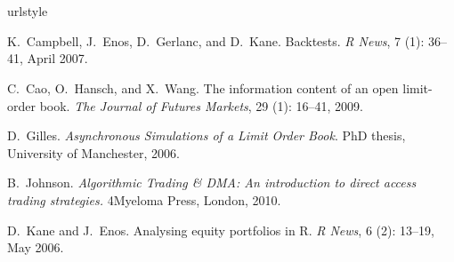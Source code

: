 \address{Andrew Liu\\
  Williams College\\
  Williamstown, MA\\
  USA}\\

\address{Khanh Nguyen\\
  University Of Massachusetts at Boston\\
  Boston, MA\\
  USA}\\

\begin{thebibliography}{5}
\providecommand{\natexlab}[1]{#1}
\providecommand{\url}[1]{\texttt{#1}}
\expandafter\ifx\csname urlstyle\endcsname\relax
  \providecommand{\doi}[1]{doi: #1}\else
  \providecommand{\doi}{doi: \begingroup \urlstyle{rm}\Url}\fi

K.~Campbell, J.~Enos, D.~Gerlanc, and D.~Kane.
\newblock Backtests.
\newblock \emph{R News}, 7 (1): 36--41, April 2007.

C.~Cao, O.~Hansch, and X.~Wang.
\newblock The information content of an open limit-order book.
\newblock \emph{The Journal of Futures Markets}, 29 (1):
  16--41, 2009.

D.~Gilles.
\newblock \emph{Asynchronous Simulations of a Limit Order Book}.
\newblock PhD thesis, University of Manchester, 2006.

B.~Johnson.
\newblock \emph{Algorithmic Trading \& DMA: An introduction to direct access
  trading strategies.}
\newblock 4Myeloma Press, London, 2010.

D.~Kane and J.~Enos.
\newblock Analysing equity portfolios in {R}.
\newblock \emph{R News}, 6 (2): 13--19, May 2006.

\end{thebibliography}
